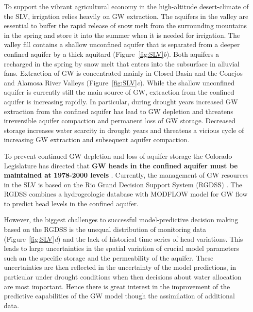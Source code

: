 \documentclass[11pt,final]{article}%
\renewcommand{\citep}{\cite}
\begin{document}
To support the vibrant agricultural economy in the high-altitude desert-climate of the SLV, irrigation relies heavily on GW extraction.  The aquifers in the valley are essential to buffer the rapid release of snow melt from the surrounding mountains in the spring and store it into the summer when it is needed for irrigation. The valley fill contains a shallow unconfined aquifer that is separated from a deeper confined aquifer by a thick aquitard (Figure~\ref{fig:SLV}\emph{b}). Both aquifers a recharged in the spring by snow melt that enters into the subsurface in alluvial fans. Extraction of GW is concentrated mainly in Closed Basin and the Conejos and Alamosa River Valleys (Figure~\ref{fig:SLV}\emph{c}). While the shallow unconfined aquifer is currently still the main source of GW, extraction from the confined aquifer is increasing rapidly. In particular, during drought years increased GW extraction from the confined aquifer has lead to GW depletion and threatens irreversible aquifer compaction and permanent loss of GW storage. Decreased storage increases water scarcity in drought years and threatens a vicious cycle of increasing GW extraction and subsequent aquifer compaction.

To prevent continued GW depletion and loss of aquifer storage  the Colorado Legislature has directed that \textbf{GW heads in the confined aquifer must be maintained at 1978-2000 levels} \citep{Rules}. Currently, the management of GW resources in the SLV is based on the Rio Grand Decision Support System (RGDSS) \citep{RGDSS}. The RGDSS combines a hydrogeologic database with MODFLOW model for GW flow to predict head levels in the confined aquifer.

However, the biggest challenges to successful model-predictive decision making based on the RGDSS is the unequal distribution of monitoring data (Figure~\ref{fig:SLV}\emph{d}) and the lack of historical time series of head variations. This leads to large uncertainties in the spatial variation of crucial model parameters such an the specific storage and the permeability of the aquifer. These uncertainties are then reflected in the uncertainty of the model predictions, in particular under drought conditions when then decisions about water allocation are most important. Hence there is great interest in the improvement of the predictive capabilities of the GW model though the assimilation of additional data.
\end{document}
